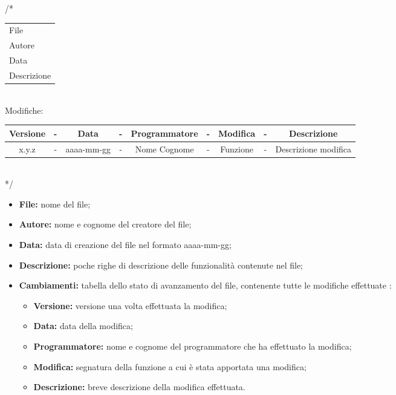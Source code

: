 \begin{flushleft}

/*\\
\vspace{3mm}
\begin{tabular}{l}
	File\\
	Autore\\
	Data\\
	Descrizione\\
\end{tabular}\\
\vspace{5mm}
 Modifiche:\\
 \vspace{3mm}
\begin{tabular}{| c c c c c c c c c |}
	\hline
	Versione & - & Data & - & Programmatore & - & Modifica & - & Descrizione\\
	\hline
	x.y.z & - & aaaa-mm-gg & - & Nome Cognome & - & Funzione & - & Descrizione modifica\\
	\hline
\end{tabular}\\
\vspace{3mm}
*/\\

\end{flushleft}

\begin{itemize}
	\item \textbf{File:} nome del file;
	\item \textbf{Autore:} nome e cognome del creatore del file;
	\item \textbf{Data:} data di creazione del file nel formato aaaa-mm-gg;
	\item \textbf{Descrizione:} poche righe di descrizione delle funzionalità contenute nel file;
	\item \textbf{Cambiamenti:} tabella dello stato di avanzamento del file, contenente tutte le modifiche effettuate :
		\begin{itemize}
			\item \textbf{Versione:} versione una volta effettuata la modifica;
			\item \textbf{Data:} data della modifica;
			\item \textbf{Programmatore:} nome e cognome del programmatore che ha effettuato la modifica;
			\item \textbf{Modifica:} segnatura della funzione a cui è stata apportata una modifica;
			\item \textbf{Descrizione:} breve descrizione della modifica effettuata.
		\end{itemize}
\end{itemize}

